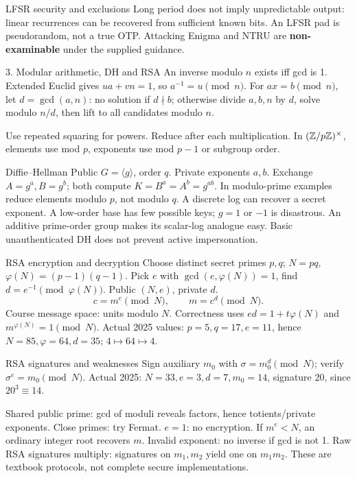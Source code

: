 \documentclass[11pt,a4paper]{article}
\begin{document}
\begin{tip}{LFSR security and exclusions}
Long period does not imply unpredictable output: linear recurrences can be recovered from sufficient known bits. An LFSR pad is pseudorandom, not a true OTP. Attacking Enigma and NTRU are \textbf{non-examinable} under the supplied guidance.
\end{tip}
\clearpage
\begin{concept}{3. Modular arithmetic, DH and RSA}
An inverse modulo \(n\) exists iff gcd is 1. Extended Euclid gives \(ua+vn=1\), so \(a^{-1}=u\pmod n\). For \(ax=b\pmod n\), let \(d=\gcd(a,n)\): no solution if \(d\nmid b\); otherwise divide \(a,b,n\) by \(d\), solve modulo \(n/d\), then lift to all candidates modulo \(n\).

Use repeated squaring for powers. Reduce after each multiplication. In \((\mathbb Z/p\mathbb Z)^\times\), elements use mod \(p\), exponents use mod \(p-1\) or subgroup order.
\end{concept}
\begin{method}{Diffie--Hellman}
Public \(G=\langle g\rangle\), order \(q\). Private exponents \(a,b\). Exchange \(A=g^a,B=g^b\); both compute \(K=B^a=A^b=g^{ab}\). In modulo-prime examples reduce elements modulo \(p\), not modulo \(q\). A discrete log can recover a secret exponent. A low-order base has few possible keys; \(g=1\) or \(-1\) is disastrous. An additive prime-order group makes its scalar-log analogue easy. Basic unauthenticated DH does not prevent active impersonation.
\end{method}
\begin{method}{RSA encryption and decryption}
Choose distinct secret primes \(p,q\); \(N=pq\), \(\varphi(N)=(p-1)(q-1)\). Pick \(e\) with \(\gcd(e,\varphi(N))=1\), find \(d=e^{-1}\pmod{\varphi(N)}\). Public \((N,e)\), private \(d\).
\[c=m^e\pmod N,\qquad m=c^d\pmod N.\]
Course message space: units modulo \(N\). Correctness uses \(ed=1+t\varphi(N)\) and \(m^{\varphi(N)}=1\pmod N\). Actual 2025 values: \(p=5,q=17,e=11\), hence \(N=85,\varphi=64,d=35\); \(4\mapsto64\mapsto4\).
\end{method}
\begin{concept}{RSA signatures and weaknesses}
Sign auxiliary \(m_0\) with \(\sigma=m_0^d\pmod N\); verify \(\sigma^e=m_0\pmod N\). Actual 2025: \(N=33,e=3,d=7,m_0=14\), signature 20, since \(20^3\equiv14\).

Shared public prime: gcd of moduli reveals factors, hence totients/private exponents. Close primes: try Fermat. \(e=1\): no encryption. If \(m^e<N\), an ordinary integer root recovers \(m\). Invalid exponent: no inverse if gcd is not 1. Raw RSA signatures multiply: signatures on \(m_1,m_2\) yield one on \(m_1m_2\). These are textbook protocols, not complete secure implementations.
\end{concept}
\end{document}
